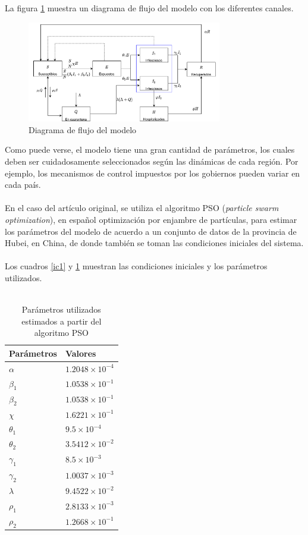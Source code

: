\documentclass[conference]{IEEEtran}
\begin{document}
La figura \ref{block_diagram} muestra un diagrama de flujo del modelo con los diferentes canales.

\begin{figure}[H]
    \centering
    \includegraphics[width=8.5cm]{../Figures/Model_flowchart.pdf}
    \caption{Diagrama de flujo del modelo}
    \label{block_diagram}
\end{figure}


Como puede verse, el modelo tiene una gran cantidad de parámetros, los cuales deben
ser cuidadosamente seleccionados según las dinámicas de cada región. Por ejemplo, los 
mecanismos de control impuestos por los gobiernos pueden variar en cada país.
\\\\
En el caso del artículo original, se utiliza el algoritmo PSO (\textit{particle swarm optimization}), en español
optimización por enjambre de partículas, para estimar los parámetros del modelo de acuerdo a un conjunto 
de datos de la provincia de Hubei, en China, de donde también se toman las condiciones iniciales 
del sistema.
\\\\
Los cuadros \ref{ic1} y \ref{p1} muestran las condiciones iniciales y los parámetros
utilizados.
\\\\
\begin{table}[h]
    \centering
    \begin{tabular}{ll}
    \hline
    Parámetros  & Valores                 \\ \hline
    $\alpha$    & $1.2048 \times 10^{-4}$ \\ 
    $\beta_1$   & $1.0538 \times 10^{-1}$ \\ 
    $\beta_2$   & $1.0538 \times 10^{-1}$ \\ 
    $\chi$      & $1.6221 \times 10^{-1}$ \\ 
    $\theta_1 $ & $9.5 \times 10^{-4}$    \\ 
    $\theta_2$  & $3.5412 \times 10^{-2}$ \\ 
    $\gamma_1$  & $8.5 \times 10^{-3}$    \\ 
    $\gamma_2$  & $1.0037 \times 10^{-3}$ \\ 
    $\lambda$   & $9.4522 \times 10^{-2}$ \\ 
    $\rho_1 $   & $2.8133 \times 10^{-3}$ \\ 
    $\rho_2$    & $1.2668 \times 10^{-1}$ \\ \hline
    \end{tabular}
    \caption{Parámetros utilizados estimados a partir del algoritmo PSO}
    \label{p1}
\end{table}
\end{document}
